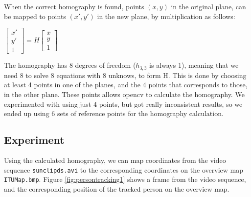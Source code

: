 \documentclass[a4paper,11pt]{article}
\begin{document}
When the correct homography is found, points $(x,y)$ in the original plane, can be mapped to points $(x',y')$ in the new plane, by multiplication as follows:

\begin{center}
$
\begin{bmatrix}
x' \\
y' \\
1
\end{bmatrix}
= H
\begin{bmatrix}
x \\
y \\
1
\end{bmatrix}
$
\end{center}

The homography has 8 degrees of freedom ($h_{3,3}$ is always 1), meaning that we need 8 to solve 8 equations with 8 unknows, to form H. This is done by choosing at least 4 points in one of the planes, and the 4 points that corresponds to those, in the other plane. These points allows opencv to calculate the homography. We experimented with using just 4 points, but got really inconsistent results, so we ended up using 6 sets of reference points for the homography calculation.

\subsection{Experiment}
Using the calculated homography, we can map coordinates from the video sequence \texttt{sunclipds.avi} to the corresponding coordinates on the overview map \texttt{ITUMap.bmp}. Figure \ref{fig:persontracking1} shows a frame from the video sequence, and the corresponding position of the tracked person on the overview map.
\end{document}
